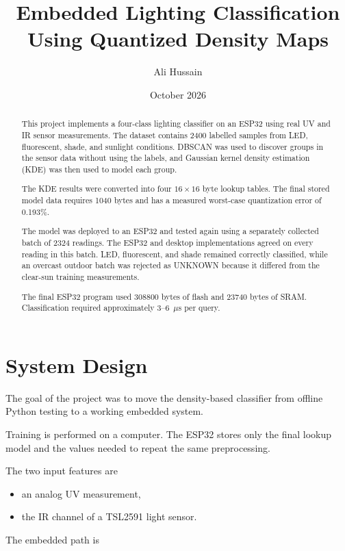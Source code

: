 \documentclass[10pt,a4paper,twocolumn]{article}
\title{Embedded Lighting Classification Using Quantized Density Maps}
\author{Ali Hussain}
\date{October 2026}
\begin{document}
\maketitle


\begin{abstract}

This project implements a four-class lighting classifier on an ESP32 using
real UV and IR sensor measurements. The dataset contains 2400 labelled samples
from LED, fluorescent, shade, and sunlight conditions. DBSCAN was used to
discover groups in the sensor data without using the labels, and Gaussian
kernel density estimation (KDE) was then used to model each group.

The KDE results were converted into four $16\times16$ byte lookup tables.
The final stored model data requires 1040 bytes and has a measured worst-case
quantization error of 0.193\%.

The model was deployed to an ESP32 and tested again using a separately
collected batch of 2324 readings. The ESP32 and desktop implementations agreed
on every reading in this batch. LED, fluorescent, and shade remained correctly
classified, while an overcast outdoor batch was rejected as UNKNOWN because
it differed from the clear-sun training measurements.

The final ESP32 program used 308800 bytes of flash and 23740 bytes of SRAM.
Classification required approximately 3--6~$\mu$s per query.

\end{abstract}


\section{System Design}

The goal of the project was to move the density-based classifier from offline
Python testing to a working embedded system.

Training is performed on a computer. The ESP32 stores only the final lookup
model and the values needed to repeat the same preprocessing.

The two input features are

\begin{itemize}
    \item an analog UV measurement,
    \item the IR channel of a TSL2591 light sensor.
\end{itemize}

The embedded path is
\end{document}
